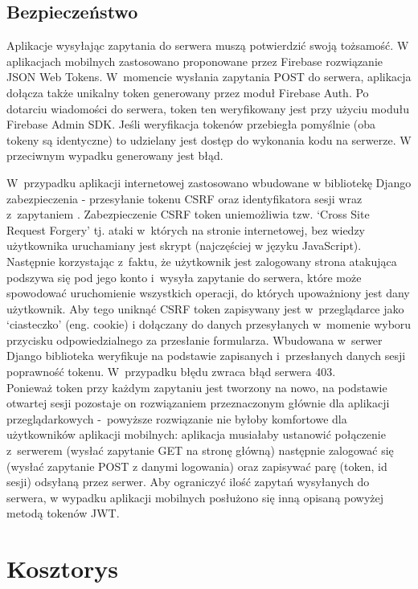 \documentclass[polish,bachelor,a4paper,oneside]{ppfcmthesis}
\begin{document}
    \section{Bezpieczeństwo}

    Aplikacje wysyłając zapytania do serwera muszą potwierdzić swoją tożsamość.
    W aplikacjach mobilnych zastosowano proponowane przez Firebase rozwiązanie JSON Web Tokens. W~momencie wysłania zapytania POST do serwera, aplikacja dołącza także unikalny token generowany przez moduł Firebase Auth. Po dotarciu wiadomości do serwera, token ten weryfikowany jest przy użyciu modułu Firebase Admin SDK. Jeśli weryfikacja tokenów przebiegła pomyślnie (oba tokeny są identyczne) to udzielany jest dostęp do wykonania kodu na serwerze. W przeciwnym wypadku generowany jest błąd.

    W~przypadku aplikacji internetowej zastosowano wbudowane w bibliotekę Django zabezpieczenia - przesyłanie tokenu CSRF oraz identyfikatora sesji wraz z~zapytaniem \cite{djangoCSRF}. Zabezpieczenie CSRF token uniemożliwia tzw. `Cross Site Request Forgery' tj. ataki w~których na stronie internetowej, bez wiedzy użytkownika uruchamiany jest skrypt (najczęściej w języku JavaScript). Następnie korzystając z~faktu, że użytkownik jest zalogowany strona atakująca podszywa się pod jego konto i~wysyła zapytanie do serwera, które może spowodować uruchomienie wszystkich operacji, do których upoważniony jest dany użytkownik. Aby tego uniknąć CSRF token zapisywany jest w~przeglądarce jako `ciasteczko' (eng. cookie) i dołączany do danych przesyłanych w~momenie wyboru przycisku odpowiedzialnego za przesłanie formularza. Wbudowana w~serwer Django biblioteka weryfikuje na podstawie zapisanych i~przesłanych danych sesji poprawność tokenu. W~przypadku błędu zwraca błąd serwera 403.
    \\Ponieważ token przy każdym zapytaniu jest tworzony na nowo, na podstawie otwartej sesji pozostaje on rozwiązaniem przeznaczonym głównie dla aplikacji przeglądarkowych -~powyższe rozwiązanie nie byłoby komfortowe dla użytkowników aplikacji mobilnych: aplikacja musiałaby ustanowić połączenie z~serwerem (wysłać zapytanie GET na stronę główną) następnie zalogować się (wysłać zapytanie POST z danymi logowania) oraz zapisywać parę (token, id sesji) odsyłaną przez serwer. Aby ograniczyć ilość zapytań wysyłanych do serwera, w wypadku aplikacji mobilnych posłużono się inną opisaną powyżej metodą tokenów JWT.

    \chapter{Kosztorys}
\end{document}
